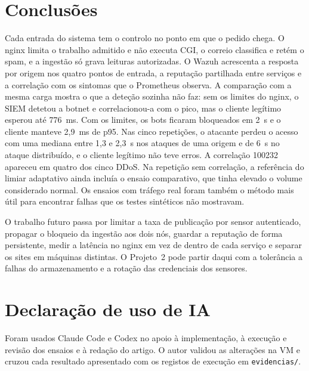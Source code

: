 \documentclass[conference,a4paper]{IEEEtran}
\newcommand{\code}[1]{\texttt{\small #1}}
\begin{document}
\section{Conclusões}
Cada entrada do sistema tem o controlo no ponto em que o pedido chega. O nginx limita o trabalho admitido e não executa CGI, o correio classifica e retém o spam, e a ingestão só grava leituras autorizadas. O Wazuh acrescenta a resposta por origem nos quatro pontos de entrada, a reputação partilhada entre serviços e a correlação com os sintomas que o Prometheus observa. A comparação com a mesma carga mostra o que a deteção sozinha não faz: sem os limites do nginx, o SIEM detetou a botnet e correlacionou-a com o pico, mas o cliente legítimo esperou até 776~ms. Com os limites, os bots ficaram bloqueados em 2~s e o cliente manteve 2,9~ms de p95. Nas cinco repetições, o atacante perdeu o acesso com uma mediana entre 1,3 e 2,3~s nos ataques de uma origem e de 6~s no ataque distribuído, e o cliente legítimo não teve erros. A correlação 100232 apareceu em quatro dos cinco DDoS. Na repetição sem correlação, a referência do limiar adaptativo ainda incluía o ensaio comparativo, que tinha elevado o volume considerado normal. Os ensaios com tráfego real foram também o método mais útil para encontrar falhas que os testes sintéticos não mostravam.

O trabalho futuro passa por limitar a taxa de publicação por sensor autenticado, propagar o bloqueio da ingestão aos dois nós, guardar a reputação de forma persistente, medir a latência no nginx em vez de dentro de cada serviço e separar os sites em máquinas distintas. O Projeto~2 pode partir daqui com a tolerância a falhas do armazenamento e a rotação das credenciais dos sensores.

\section*{Declaração de uso de IA}
Foram usados Claude Code e Codex no apoio à implementação, à execução e revisão dos ensaios e à redação do artigo. O autor validou as alterações na VM e cruzou cada resultado apresentado com os registos de execução em \code{evidencias/}.
\end{document}
